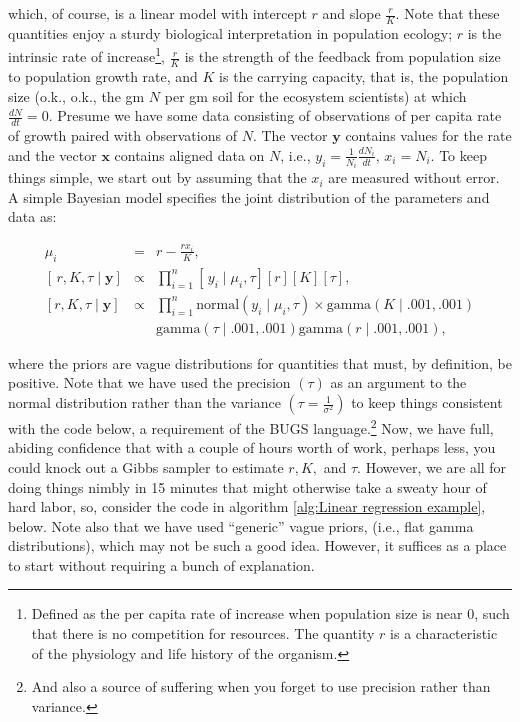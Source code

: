 \documentclass[12pt,english]{article}
\begin{document}
\noindent which, of course, is a linear model with intercept $r$ and slope $\frac{r}{K}$. Note that these quantities enjoy a sturdy biological interpretation in population ecology; $r$ is the intrinsic rate of increase\footnote{Defined as the per capita rate of increase when population size is near 0, such that there is no competition for resources. The quantity $r$ is a characteristic of the physiology and life history of the organism.}, $\frac{r}{K}$ is the strength of the feedback from population size to population growth rate, and $K$ is the carrying capacity, that is, the population size (o.k., o.k., the gm $N$ per gm soil for the ecosystem scientists) at which $\frac{}{}$$\frac{dN}{dt}=0$. Presume we have some data consisting of observations of per capita rate of growth paired with observations of $N$. The vector $\mathbf{y}$ contains values for the rate and the vector $\mathbf{x}$ contains aligned data on $N$, i.e., $y_{i}=\frac{1}{N_{i}}\frac{dN_{i}}{dt},\, x_{i}=N_{i}$. To keep things simple, we start out by assuming that the $x_{i}$ are measured without error. A simple Bayesian model specifies the joint distribution of the parameters and data as: 

\begin{eqnarray}
\mu_{i} & = & r-\frac{rx_{i}}{K}\textrm{,}\\
\left[\,r,K,\tau\mid\mathbf{y}\right] & \propto & \prod_{i=1}^{n}\left[\,y_{i}\mid\mu_{i},\tau\right]\left[r\right]\left[K\right]\left[\tau\right]\textrm{,}\nonumber \\
\left[r,K,\tau\mid\mathbf{y}\right] & \propto & \prod_{i=1}^{n}\textrm{normal}\left(y_{i}\mid\mu_{i},\tau\right)\times\label{eq:conditional} \textrm{gamma}\left(K\mid.001,.001\right)\\
 &  &\textrm{gamma}\left(\tau\mid.001,.001\right)\textrm{gamma}\left(r\mid.001,.001\right),\nonumber 
\end{eqnarray}



\noindent where the priors are vague distributions for quantities that must, by definition, be positive. Note that we have used the precision $(\tau)$ as an argument to the normal distribution rather than the variance $\left(\tau=\frac{1}{\sigma^{2}}\right)$ to keep things consistent with the code below, a requirement of the BUGS language.\footnote{And also a source of suffering when you forget to use precision rather than variance.} Now, we have full, abiding confidence that with a couple of hours worth of work, perhaps less, you could knock out a Gibbs sampler to estimate $r,K,$ and $\tau$. However, we are all for doing things nimbly in 15 minutes that might otherwise take a sweaty hour of hard labor, so, consider the code in algorithm \ref{alg:Linear regression example}, below. Note also that we have used \enquote{generic} vague priors, (i.e., flat gamma distributions), which may not be such a good idea. However, it suffices as a place to start without requiring a bunch of explanation.
\end{document}

